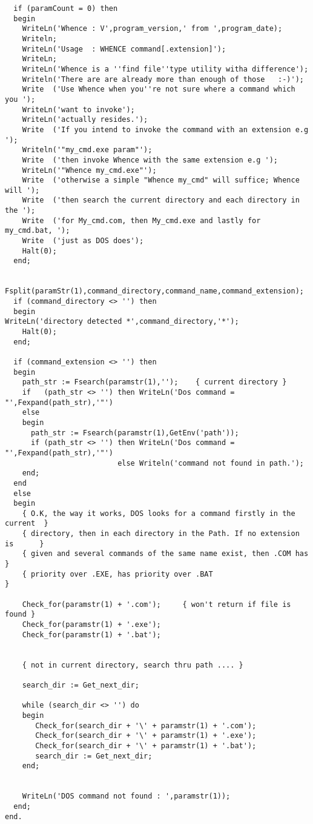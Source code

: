 \begin{verbatim}
  if (paramCount = 0) then
  begin
    WriteLn('Whence : V',program_version,' from ',program_date);
    Writeln;
    WriteLn('Usage  : WHENCE command[.extension]');
    WriteLn;
    WriteLn('Whence is a ''find file''type utility witha difference');
    Writeln('There are are already more than enough of those   :-)');
    Write  ('Use Whence when you''re not sure where a command which you ');
    WriteLn('want to invoke');
    WriteLn('actually resides.');
    Write  ('If you intend to invoke the command with an extension e.g ');
    Writeln('"my_cmd.exe param"');
    Write  ('then invoke Whence with the same extension e.g ');
    WriteLn('"Whence my_cmd.exe"');
    Write  ('otherwise a simple "Whence my_cmd" will suffice; Whence will ');
    Write  ('then search the current directory and each directory in the ');
    Write  ('for My_cmd.com, then My_cmd.exe and lastly for my_cmd.bat, ');
    Write  ('just as DOS does');
    Halt(0);
  end;

  Fsplit(paramStr(1),command_directory,command_name,command_extension);
  if (command_directory <> '') then
  begin
WriteLn('directory detected *',command_directory,'*');
    Halt(0);
  end;

  if (command_extension <> '') then
  begin
    path_str := Fsearch(paramstr(1),'');    { current directory }
    if   (path_str <> '') then WriteLn('Dos command = "',Fexpand(path_str),'"')
    else
    begin
      path_str := Fsearch(paramstr(1),GetEnv('path'));
      if (path_str <> '') then WriteLn('Dos command = "',Fexpand(path_str),'"')
                          else Writeln('command not found in path.');
    end;
  end
  else
  begin
    { O.K, the way it works, DOS looks for a command firstly in the current  }
    { directory, then in each directory in the Path. If no extension is      }
    { given and several commands of the same name exist, then .COM has       }
    { priority over .EXE, has priority over .BAT                             }

    Check_for(paramstr(1) + '.com');     { won't return if file is found }
    Check_for(paramstr(1) + '.exe');
    Check_for(paramstr(1) + '.bat');


    { not in current directory, search thru path .... }

    search_dir := Get_next_dir;

    while (search_dir <> '') do
    begin
       Check_for(search_dir + '\' + paramstr(1) + '.com');
       Check_for(search_dir + '\' + paramstr(1) + '.exe');
       Check_for(search_dir + '\' + paramstr(1) + '.bat');
       search_dir := Get_next_dir;
    end;


    WriteLn('DOS command not found : ',paramstr(1));
  end;
end.

\end{verbatim}
